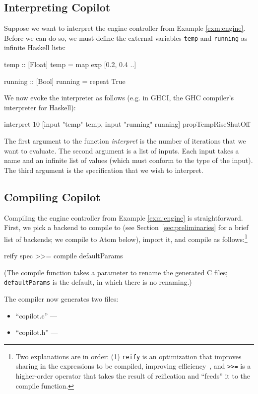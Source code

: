 \documentclass[]{article}
\theoremstyle{example}
\begin{document}
\subsection{Interpreting Copilot}

Suppose we want to interpret the engine controller from Example \ref{exm:engine}.
Before we can do so, we must define the external variables {\tt temp}
and {\tt running} as infinite Haskell lists:
%
\begin{code}
temp :: [Float]
temp = map exp [0.2, 0.4 ..]

running :: [Bool]
running = repeat True
\end{code}
%
We now evoke the interpreter as follows (e.g. in GHCI, the GHC compiler's
interpreter for Haskell):
%
\begin{code}
interpret
  10
  [input "temp" temp, input "running" running]
  propTempRiseShutOff
\end{code}
%
The first argument to the function \emph{interpret} is the number of iterations that we want to evaluate.
The second argument is a list of inputs. Each input takes a name and an infinite list of
values (which must conform to the type of the input). The third argument is the specification
that we wish to interpret.

\subsection{Compiling Copilot}

Compiling the engine controller from Example \ref{exm:engine} is
straightforward.  First, we pick a backend to compile to (see
Section~\ref{sec:preliminaries} for a brief list of backends; we compile to Atom
below), import it, and
compile as follows:\footnote{Two explanations are in order: (1) {\tt reify} is
an optimization that improves sharing in the expressions to be compiled,
improving efficiency~\cite{DSLExtract}, and {\tt >>=} is a higher-order operator that takes the
result of reification and ``feeds'' it to the compile function.}
%
\begin{code}
reify spec >>= compile defaultParams
\end{code}
%
\noindent
(The compile function takes a parameter to rename the generated C files; {\tt
  defaultParams} is the default, in which there is no renaming.)

The compiler now generates two files:

\begin{itemize}
\item ``copilot.c'' --- 
\item ``copilot.h'' --- 
\end{itemize}
\end{document}
